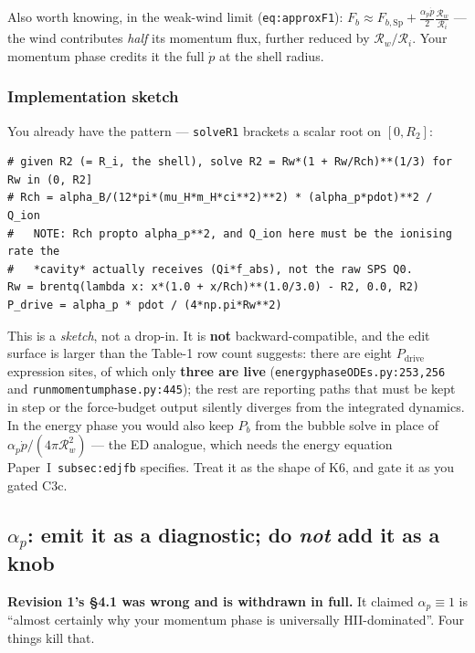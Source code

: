 \documentclass[11pt,a4paper,oneside]{report}
\newcommand{\brkus}{\textunderscore\allowbreak}
\newcommand{\code}[1]{\texttt{\small\let\_\brkus #1}}
\newcommand{\lbl}[1]{\texttt{\footnotesize\let\_\brkus #1}}
\newcommand{\PI}{Paper~I}
\newcommand{\Rw}{\mathcal{R}_{w}}
\newcommand{\Ri}{\mathcal{R}_{i}}
\newcommand{\pdotw}{\dot p}
\newcommand{\ap}{\alpha_p}
\newcommand{\Pb}{P_{b}}
\newcommand{\Pdrive}{P_{\mathrm{drive}}}
\newcommand{\Fsp}{F_{b,\mathrm{Sp}}}
\newcommand{\up}[1]{\textcolor{tqaccent}{\textbf{#1}}}
\begin{document}
Also worth knowing, in the weak-wind limit (\lbl{eq:approxF1}):
$F_b\approx\Fsp+\tfrac{\ap\pdotw}{2}\frac{\Rw}{\Ri}$ --- the wind contributes \emph{half} its
momentum flux, further reduced by $\Rw/\Ri$. Your momentum phase credits it the full
$\pdotw$ at the shell radius.

\subsubsection*{Implementation sketch}

You already have the pattern --- \code{solve\_R1} brackets a scalar root on $[0,R_2]$:

\begin{lstlisting}
# given R2 (= R_i, the shell), solve R2 = Rw*(1 + Rw/Rch)**(1/3) for Rw in (0, R2]
# Rch = alpha_B/(12*pi*(mu_H*m_H*ci**2)**2) * (alpha_p*pdot)**2 / Q_ion
#   NOTE: Rch propto alpha_p**2, and Q_ion here must be the ionising rate the
#   *cavity* actually receives (Qi*f_abs), not the raw SPS Q0.
Rw = brentq(lambda x: x*(1.0 + x/Rch)**(1.0/3.0) - R2, 0.0, R2)
P_drive = alpha_p * pdot / (4*np.pi*Rw**2)
\end{lstlisting}

This is a \emph{sketch}, not a drop-in. It is \up{not} backward-compatible, and the edit surface is
larger than the Table-1 row count suggests: there are eight $\Pdrive$ expression sites, of which only
\up{three are live} (\code{energy\_phase\_ODEs.py:253,256} and \code{run\_momentum\_phase.py:445});
the rest are reporting paths that must be kept in step or the force-budget output silently diverges
from the integrated dynamics. In the energy phase you would also keep $\Pb$ from the bubble solve in
place of $\ap\pdotw/(4\pi\Rw^2)$ --- the ED analogue, which needs the energy equation \PI\
\lbl{subsec:ed\_jfb} specifies. Treat it as the shape of K6, and gate it
as you gated C3c.

\subsection{$\ap$: emit it as a diagnostic; do \emph{not} add it as a knob}
\label{sec:alphap}

\begin{keybox}
\textbf{\sffamily Revision 1's \S4.1 was wrong and is withdrawn in full.} It claimed
$\ap\equiv1$ is ``almost certainly why your momentum phase is universally HII-dominated''.
Four things kill that.
\end{keybox}
\end{document}
